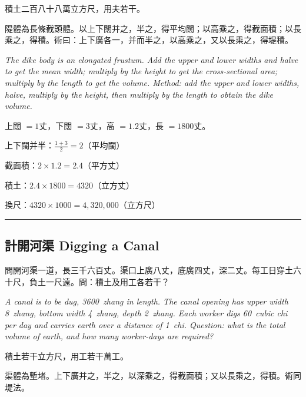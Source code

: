 \documentclass[11pt,a4paper]{article}
\newcommand{\longline}{\noindent\rule{\textwidth}{0.4pt}}
\begin{document}
\begin{answer}
積土二百八十八萬立方尺，用夫若干。
\end{answer}

\begin{method}
隄體為長條截頭體。以上下闊并之，半之，得平均闊；以高乘之，得截面積；以長乘之，得積。術曰：上下廣各一，并而半之，以高乘之，又以長乘之，得堤積。

\textit{The dike body is an elongated frustum. Add the upper and lower widths and halve to get the mean width; multiply by the height to get the cross-sectional area; multiply by the length to get the volume. Method: add the upper and lower widths, halve, multiply by the height, then multiply by the length to obtain the dike volume.}
\end{method}

\begin{working}
上闊 $= 1$丈，下闊 $= 3$丈，高 $= 1.2$丈，長 $= 1800$丈。

上下闊并半：$\displaystyle\frac{1+3}{2} = 2$（平均闊）

截面積：$2 \times 1.2 = 2.4$（平方丈）

積土：$2.4 \times 1800 = 4320$（立方丈）

換尺：$4320 \times 1000 = 4{,}320{,}000$（立方尺）
\end{working}

\vspace{0.5em}
\longline

\subsection{計開河渠 \quad Digging a Canal}

\begin{problem}
問開河渠一道，長三千六百丈。渠口上廣八丈，底廣四丈，深二丈。每工日穿土六十尺，負土一尺遠。問：積土及用工各若干？

\textit{A canal is to be dug, 3600~zhang in length. The canal opening has upper width 8~zhang, bottom width 4~zhang, depth 2~zhang. Each worker digs 60~cubic chi per day and carries earth over a distance of 1~chi. Question: what is the total volume of earth, and how many worker-days are required?}
\end{problem}

\begin{answer}
積土若干立方尺，用工若干萬工。
\end{answer}

\begin{method}
渠體為塹堵。上下廣并之，半之，以深乘之，得截面積；又以長乘之，得積。術同堤法。
\end{method}
\end{document}
